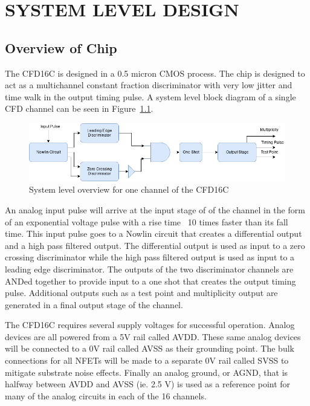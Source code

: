 \documentclass[12pt,oneside,final]{siuethesis}
\theoremstyle{definition}
\begin{document}
\chapter{SYSTEM LEVEL DESIGN}
\section{Overview of Chip}
\par The CFD16C is designed in a 0.5 micron CMOS process. The chip is designed to act as a multichannel constant fraction discriminator with very low jitter and time walk in the output timing pulse. A system level block diagram of a single CFD channel can be seen in Figure~\ref{fig:CFD}.

\begin{figure}[ht]
\centering
\includegraphics[scale=.55,keepaspectratio=true]{images/CFD.png} 
\caption{System level overview for one channel of the CFD16C}
\label{fig:CFD}
\end{figure}

\par An analog input pulse will arrive at the input stage of of the channel in the form of an exponential voltage pulse with a rise time ~10 times faster than its fall time. This input pulse goes to a Nowlin circuit that creates a differential output and a high pass filtered output. The differential output is used as input to a zero crossing discriminator while the high pass filtered output is used as input to a leading edge discriminator. The outputs of the two discriminator channels are ANDed together to provide input to a one shot that creates the output timing pulse. Additional outputs such as a test point and multiplicity output are generated in a final output stage of the channel. 

\par The CFD16C requires several supply voltages for successful operation. Analog devices are all powered from a 5V rail called AVDD. These same analog devices will be connected to a 0V rail called AVSS as their grounding point. The bulk connections for all NFETs will be made to a separate 0V rail called SVSS to mitigate substrate noise effects. Finally an analog ground, or AGND, that is halfway between AVDD and AVSS (ie. 2.5 V) is used as a reference point for many of the analog circuits in each of the 16 channels. 
\end{document}
